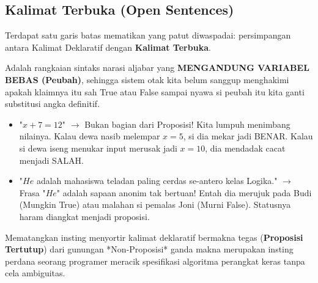 \subsection{Kalimat Terbuka (Open Sentences)}

Terdapat satu garis batas mematikan yang patut diwaspadai: persimpangan antara Kalimat Deklaratif dengan \textbf{Kalimat Terbuka}. 

\begin{definisi}
Adalah rangkaian sintaks narasi aljabar yang \textbf{MENGANDUNG VARIABEL BEBAS (Peubah)}, sehingga sistem otak kita belum sanggup menghakimi apakah klaimnya itu sah True atau False sampai nyawa si peubah itu kita ganti substitusi angka definitif.
\end{definisi}

\begin{contoh}
    \begin{itemize}
        \item "$x + 7 = 12$" \quad $\rightarrow$ Bukan bagian dari Proposisi! Kita lumpuh menimbang nilainya. Kalau dewa nasib melempar $x = 5$, si dia mekar jadi BENAR. Kalau si dewa iseng menukar input merusak jadi $x=10$, dia mendadak cacat menjadi SALAH.
        \item "$He$ adalah mahasiswa teladan paling cerdas se-antero kelas Logika." \quad $\rightarrow$ Frasa "$He$" adalah sapaan anonim tak bertuan! Entah dia merujuk pada Budi (Mungkin True) atau malahan si pemalas Joni (Murni False). Statusnya haram diangkat menjadi proposisi.
    \end{itemize}
\end{contoh}
Mematangkan insting menyortir kalimat deklaratif bermakna tegas (\textbf{Proposisi Tertutup}) dari gunungan *Non-Proposisi* ganda makna merupakan insting perdana seorang programer meracik spesifikasi algoritma perangkat keras tanpa cela ambiguitas.
